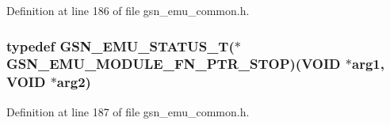 Definition at line 186 of file gsn\_\-emu\_\-common.h.

\hypertarget{a00490_a4f4448985a9e37498dc826597d03c746}{
\subsubsection[{GSN\_\-EMU\_\-MODULE\_\-FN\_\-PTR\_\-STOP}]{\setlength{\rightskip}{0pt plus 5cm}typedef {\bf GSN\_\-EMU\_\-STATUS\_\-T}($\ast$  {\bf GSN\_\-EMU\_\-MODULE\_\-FN\_\-PTR\_\-STOP})(VOID $\ast$arg1, VOID $\ast$arg2)}}
\label{a00490_a4f4448985a9e37498dc826597d03c746}


Definition at line 187 of file gsn\_\-emu\_\-common.h.

